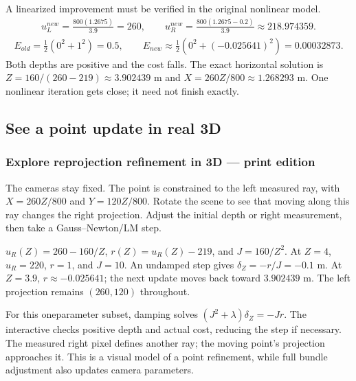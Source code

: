 \documentclass[letterpaper,11pt,english,openany,oneside]{jupyterBook}
\begin{document}
\begin{TextbookBox}
\sphinxAtStartPar
{} A linearized improvement must be verified in the original nonlinear model.
{\color{QuizMathBlue} \begin{equation*}
\begin{split}u_L^{new}=\frac{800(1.2675)}{3.9}=260,\qquad
u_R^{new}=\frac{800(1.2675-0.2)}{3.9}\approx218.974359.\end{split}
\end{equation*}}{\color{QuizMathBlue} \begin{equation*}
\begin{split}E_{old}=\tfrac12(0^2+1^2)=0.5,\qquad
E_{new}\approx\tfrac12(0^2+(-0.025641)^2)=0.00032873.\end{split}
\end{equation*}}
\sphinxAtStartPar
Both depths are positive and the cost falls. The exact horizontal solution is {\color{QuizMathBlue} \(Z=160/(260-219)\approx3.902439\)} m and {\color{QuizMathBlue} \(X=260Z/800\approx1.268293\)} m. One nonlinear iteration gets close; it need not finish exactly.

\par

\end{TextbookBox}


\subsection{See a point update in real 3D}
\label{\detokenize{lectures/lecture06/optimization:see-a-point-update-in-real-3d}}
\subsubsection*{Explore reprojection refinement in 3D — print edition}

\sphinxAtStartPar
The cameras stay fixed. The point is constrained to the left measured ray, with \(X=260Z/800\) and \(Y=120Z/800\). Rotate the scene to see that moving along this ray changes the right projection. Adjust the initial depth or right measurement, then take a Gauss–Newton/LM step.

\sphinxAtStartPar
{} \(u_R(Z)=260-160/Z\), \(r(Z)=u_R(Z)-219\), and \(J=160/Z^2\). At \(Z=4\), \(u_R=220\), \(r=1\), and \(J=10\). An undamped step gives \(\delta_Z=-r/J=-0.1\) m. At \(Z=3.9\), \(r\approx-0.025641\); the next update moves back toward \(3.902439\) m. The left projection remains \((260,120)\) throughout.

\sphinxAtStartPar
For this one\sphinxhyphen{}parameter subset, damping solves \((J^2+\lambda)\delta_Z=-Jr\). The interactive checks positive depth and actual cost, reducing the step if necessary. The measured right pixel defines another ray; the moving point’s projection approaches it. This is a visual model of a point refinement, while full bundle adjustment also updates camera parameters.
\end{document}
